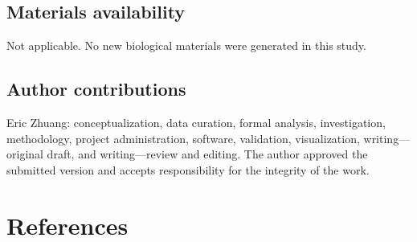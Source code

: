 \documentclass[referee,pdflatex,sn-basic,Numbered]{sn-jnl}
\begin{document}
\subsection*{Materials availability}

Not applicable. No new biological materials were generated in this study.

\subsection*{Author contributions}

Eric Zhuang: conceptualization, data curation, formal analysis, investigation, methodology, project administration, software, validation, visualization, writing---original draft, and writing---review and editing. The author approved the submitted version and accepts responsibility for the integrity of the work.

\section*{References}
\end{document}
